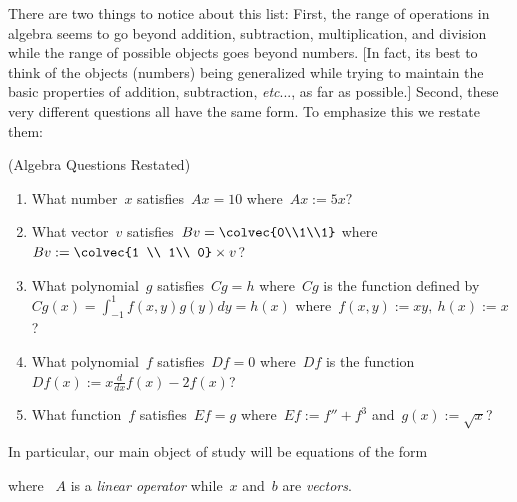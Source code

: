 \noindent
There are two things to notice about  this list: First,  the range of operations in algebra seems to go beyond addition, subtraction, multiplication, and division while the range of possible objects goes beyond numbers. [In fact, its best to think of the objects (numbers) being generalized while trying to maintain
the basic properties of addition, subtraction, {\itshape etc}..., as far as possible.]
Second, these very different questions all have the same form. To emphasize this we restate them:
\begin{example} (Algebra \hypertarget{AandD}{Questions} Restated) \\[-.5cm]
\begin{enumerate}
\item 
What 
number~$x$ satisfies~$Ax=10$ where~$Ax:=5x?$\\[-.6cm]
\item What vector~$v$ satisfies~$Bv = \colvec{0\\1\\1}$%
where ~$Bv:=\colvec{1 \\ 1\\ 0} \times v$?\\[-.4cm]
\item  What polynomial~$g$ satisfies~$Cg=h$ where~$Cg$ is the function defined by \\[.3cm]
$Cg(x)=\int_{-1}^1 f(x,y)g(y) dy = h(x)$ where~$f(x,y):=xy,~h(x):=x$?\\[-.5cm]
\item What polynomial~$f$ satisfies~$Df=0$ 
where~$Df$ is the function \\[.3cm]
$Df(x):=x\frac{d}{dx}f(x)-2f(x)$?\\[-5mm]
\item What function~$f$ satisfies~$Ef=g$ where~$Ef:=f''+f^3$ and~$g(x):=\sqrt{x}$?
\end{enumerate}
\end{example}
\noindent
In particular, 
our main object of study will be equations of the form
\begin{center}
\end{center}
where ~$A$ is a {\itshape linear operator} while~$x$ and~$b$ are {\itshape vectors}.


